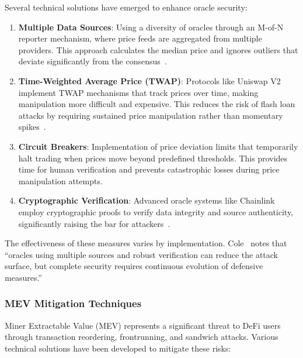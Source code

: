 \documentclass[conference]{IEEEtran}
\begin{document}
    Several technical solutions have emerged to enhance oracle security:
    \begin{enumerate}
        \item \textbf{Multiple Data Sources}: Using a diversity of oracles through an M-of-N reporter mechanism, where price feeds are aggregated from multiple providers. This approach calculates the median price and ignores outliers that deviate significantly from the consensus~\cite{wu2025exploring}.
        
        \item \textbf{Time-Weighted Average Price (TWAP)}: Protocols like Uniswap V2 implement TWAP mechanisms that track prices over time, making manipulation more difficult and expensive. This reduces the risk of flash loan attacks by requiring sustained price manipulation rather than momentary spikes~\cite{aspembitova2023oracles}.
        
        \item \textbf{Circuit Breakers}: Implementation of price deviation limits that temporarily halt trading when prices move beyond predefined thresholds. This provides time for human verification and prevents catastrophic losses during price manipulation attempts.
        
        \item \textbf{Cryptographic Verification}: Advanced oracle systems like Chainlink employ cryptographic proofs to verify data integrity and source authenticity, significantly raising the bar for attackers~\cite{werner2021sok}.
    \end{enumerate}

    The effectiveness of these measures varies by implementation. Cole~\cite{cole2024understanding} notes that ``oracles using multiple sources and robust verification can reduce the attack surface, but complete security requires continuous evolution of defensive measures.''

    \subsubsection{MEV Mitigation Techniques}
    Miner Extractable Value (MEV) represents a significant threat to DeFi users through transaction reordering, frontrunning, and sandwich attacks. Various technical solutions have been developed to mitigate these risks:
\end{document}
